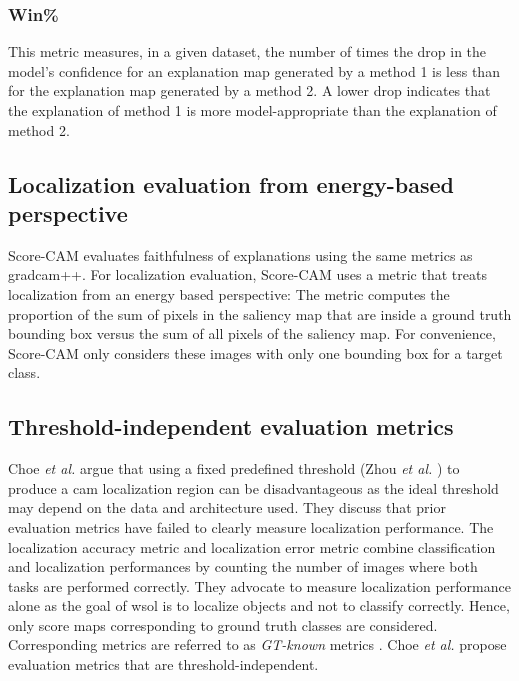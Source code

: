 \subsubsection{Win\%}
This metric measures, in a given dataset, the number of times the drop in the model's confidence for an explanation map generated by a method 1 is less than for the explanation map generated by a method 2. A lower drop indicates that the explanation of method 1 is more model-appropriate than the explanation of method 2.

\subsection{Localization evaluation from energy-based perspective}
Score-CAM evaluates faithfulness of explanations using the same metrics as \acrshort{gradcam}++. For localization evaluation, Score-CAM uses a metric that treats localization from an energy based perspective: The metric computes the proportion of the sum of pixels in the saliency map that are inside a ground truth bounding box versus the sum of all pixels of the saliency map. For convenience, Score-CAM only considers these images with only one bounding box for a target class.

\subsection{Threshold-independent evaluation metrics}
Choe \textit{et al.} \cite{choe2020evaluating, choe2022evaluation} argue that using a fixed predefined threshold (Zhou \textit{et al.} \cite{zhou2016cvpr}) to produce a \acrshort{cam} localization region can be disadvantageous as the ideal threshold may depend on the data and architecture used. They discuss that prior evaluation metrics have failed to clearly measure localization performance. The localization accuracy metric \cite{russakovsky2015imagenet} and localization error metric \cite{zhou2016cvpr, selvaraju2017grad} combine classification and localization performances by counting the number of images where both tasks are performed correctly. They advocate to measure localization performance alone as the goal of \acrshort{wsol} is to localize objects and not to classify correctly. Hence, only score maps corresponding to ground truth classes are considered. Corresponding metrics are referred to as \textit{GT-known} metrics \cite{choe2019attention, singh2017hide, zhang2018adversarial, zhang2018self}. Choe \textit{et al.} propose evaluation metrics that are threshold-independent.

